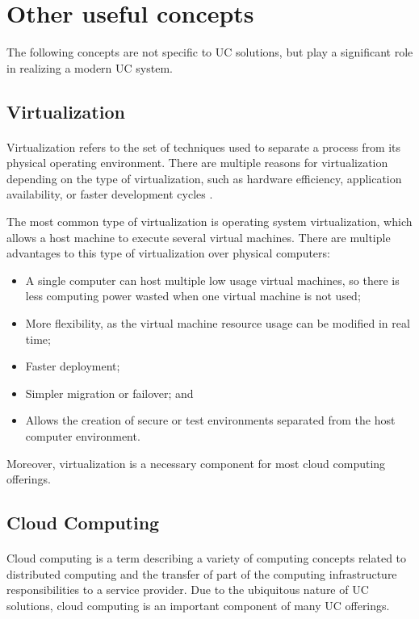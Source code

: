 \section{Other useful concepts}
The following concepts are not specific to UC solutions, but play a significant role in realizing a modern UC system.


\subsection{Virtualization}
\paragraph{}
Virtualization refers to the set of techniques used to separate a process from its physical operating environment.
There are multiple reasons for virtualization depending on the type of virtualization, such as hardware efficiency, application availability, or faster development cycles
\cite{alan_murphy_virtualization_2008}.

The most common type of virtualization is operating system virtualization, which allows a host machine to execute several virtual machines. There are multiple advantages to this type of virtualization over physical computers:
\begin{itemize}
\item A single computer can host multiple low usage virtual machines, so there is less computing power wasted when one virtual machine is not used;
\item More flexibility, as the virtual machine resource usage can be modified in real time;
\item Faster deployment;
\item Simpler migration or failover; and
\item Allows the creation of secure or test environments separated from the host computer environment.
\end{itemize}

Moreover, virtualization is a necessary component for most cloud computing offerings.

\subsection{Cloud Computing}\label{background_cloud}
\paragraph{}
Cloud computing is a term describing a variety of computing concepts related to distributed computing and the transfer of part of the computing infrastructure responsibilities to a service provider. Due to the ubiquitous nature of UC solutions, cloud computing is an important component of many UC offerings.

